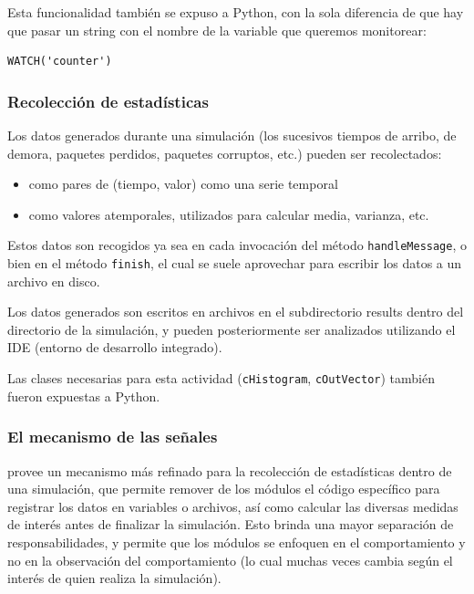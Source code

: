 \documentclass[]{article}
\begin{document}
Esta funcionalidad también se expuso a Python, con la sola diferencia de que
hay que pasar un string con el nombre de la variable que queremos monitorear:

\begin{verbatim}
WATCH('counter')
\end{verbatim}

\subsubsection{Recolección de estadísticas}

Los datos generados durante una simulación (los sucesivos tiempos de arribo, de
demora, paquetes perdidos, paquetes corruptos, etc.) pueden ser recolectados:

\begin{itemize}
    \item como pares de (tiempo, valor) como una serie temporal
    \item como valores atemporales, utilizados para calcular media, varianza,
etc.
\end{itemize}

Estos datos son recogidos ya sea en cada invocación del método
\verb!handleMessage!, o bien en el método \verb!finish!, el cual se suele
aprovechar para escribir los datos a un archivo en disco.

Los datos generados son escritos en archivos en el subdirectorio results dentro
del directorio de la simulación, y pueden posteriormente ser analizados
utilizando el IDE (entorno de desarrollo integrado).

Las clases necesarias para esta actividad (\verb!cHistogram!,
\verb!cOutVector!) también fueron expuestas a Python.

\subsubsection{El mecanismo de las señales}

\omnetpp{} provee un mecanismo más refinado para la recolección de estadísticas
dentro de una simulación, que permite remover de los módulos el código
específico para registrar los datos en variables o archivos, así como calcular
las diversas medidas de interés antes de finalizar la simulación. Esto brinda
una mayor separación de responsabilidades, y permite que los módulos se
enfoquen en el comportamiento y no en la observación del comportamiento (lo
cual muchas veces cambia según el interés de quien realiza la simulación).
\end{document}
